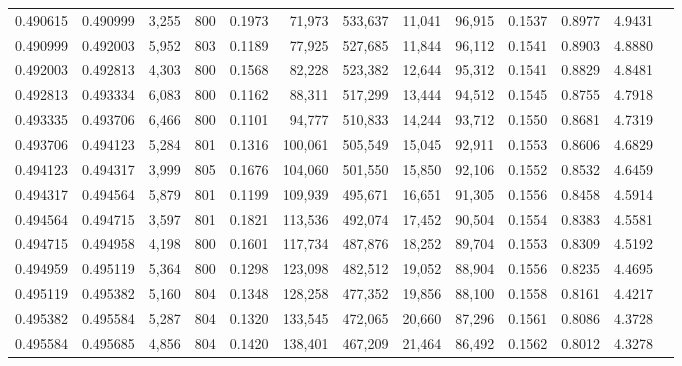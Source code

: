 \begin{tabular}{rrrrrrrrrrrrr}
0.490615 & 0.490999 & 3,255 & 800 &                                     0.1973 &  71,973 & 533,637 &  11,041 &  96,915 & 0.1537 & 0.8977 & 4.9431 \\
0.490999 & 0.492003 & 5,952 & 803 &                                     0.1189 &  77,925 & 527,685 &  11,844 &  96,112 & 0.1541 & 0.8903 & 4.8880 \\
0.492003 & 0.492813 & 4,303 & 800 &                                     0.1568 &  82,228 & 523,382 &  12,644 &  95,312 & 0.1541 & 0.8829 & 4.8481 \\
0.492813 & 0.493334 & 6,083 & 800 &                                     0.1162 &  88,311 & 517,299 &  13,444 &  94,512 & 0.1545 & 0.8755 & 4.7918 \\
0.493335 & 0.493706 & 6,466 & 800 &                                     0.1101 &  94,777 & 510,833 &  14,244 &  93,712 & 0.1550 & 0.8681 & 4.7319 \\
0.493706 & 0.494123 & 5,284 & 801 &                                     0.1316 & 100,061 & 505,549 &  15,045 &  92,911 & 0.1553 & 0.8606 & 4.6829 \\
0.494123 & 0.494317 & 3,999 & 805 &                                     0.1676 & 104,060 & 501,550 &  15,850 &  92,106 & 0.1552 & 0.8532 & 4.6459 \\
0.494317 & 0.494564 & 5,879 & 801 &                                     0.1199 & 109,939 & 495,671 &  16,651 &  91,305 & 0.1556 & 0.8458 & 4.5914 \\
0.494564 & 0.494715 & 3,597 & 801 &                                     0.1821 & 113,536 & 492,074 &  17,452 &  90,504 & 0.1554 & 0.8383 & 4.5581 \\
0.494715 & 0.494958 & 4,198 & 800 &                                     0.1601 & 117,734 & 487,876 &  18,252 &  89,704 & 0.1553 & 0.8309 & 4.5192 \\
0.494959 & 0.495119 & 5,364 & 800 &                                     0.1298 & 123,098 & 482,512 &  19,052 &  88,904 & 0.1556 & 0.8235 & 4.4695 \\
0.495119 & 0.495382 & 5,160 & 804 &                                     0.1348 & 128,258 & 477,352 &  19,856 &  88,100 & 0.1558 & 0.8161 & 4.4217 \\
0.495382 & 0.495584 & 5,287 & 804 &                                     0.1320 & 133,545 & 472,065 &  20,660 &  87,296 & 0.1561 & 0.8086 & 4.3728 \\
0.495584 & 0.495685 & 4,856 & 804 &                                     0.1420 & 138,401 & 467,209 &  21,464 &  86,492 & 0.1562 & 0.8012 & 4.3278 \\

\end{tabular}
